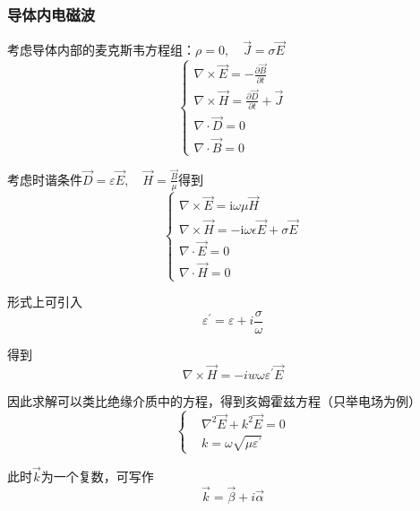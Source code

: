 \documentclass[UTF8]{ctexart}
\begin{document}
    \subsubsection{导体内电磁波}
    考虑导体内部的麦克斯韦方程组：$\rho=0, \quad \vec{J} = \sigma \vec{E}$
    \begin{equation}
        \left \{ \begin{array}{l}{\nabla \times \vec{E}=-\frac{\partial \vec{B}}{\partial t}} \\ {\nabla \times \vec{H}=\frac{\partial \vec{D}}{\partial t}+\vec{J}} \\ {\nabla \cdot \vec{D}=0} \\ {\nabla \cdot \vec{B}=0}\end{array} \right.
    \end{equation}
    
\noindent 考虑时谐条件$\vec{D} = \varepsilon \vec{E}, \quad \vec{H} = \frac{\vec{B}}{\mu}$得到
\begin{equation}
    \left \{ \begin{array}{l}{\nabla \times \vec{E}=\mathrm{i} \omega \mu \vec{H}} \\ {\nabla \times \vec{H}=-\mathrm{i} \omega \epsilon \vec{E}+\sigma \vec{E}} \\ {\nabla \cdot \vec{E}=0} \\ {\nabla \cdot \vec{H}=0}\end{array} \right.
\end{equation}

    形式上可引入
    \begin{equation}
        \varepsilon^{\prime} = \varepsilon + i \frac{\sigma}{\omega}
    \end{equation}

\noindent 得到
\begin{equation}
    \nabla \times \vec{H} = -i w \omega \varepsilon^{\prime} \vec{E}
\end{equation}

\noindent 因此求解可以类比绝缘介质中的方程，得到亥姆霍兹方程（只举电场为例）
\begin{equation}
    \left \{ \begin{aligned}
        &\nabla^2 \vec{E} + k^2 \vec{E} = 0 \\
        &k=\omega \sqrt{\mu \varepsilon^{\prime}} 
    \end{aligned} \right.
\end{equation}

    此时$\vec{k}$为一个复数，可写作
    \begin{equation}
        \vec{k} = \vec{\beta}+ i \vec{\alpha}
    \end{equation}
\end{document}
